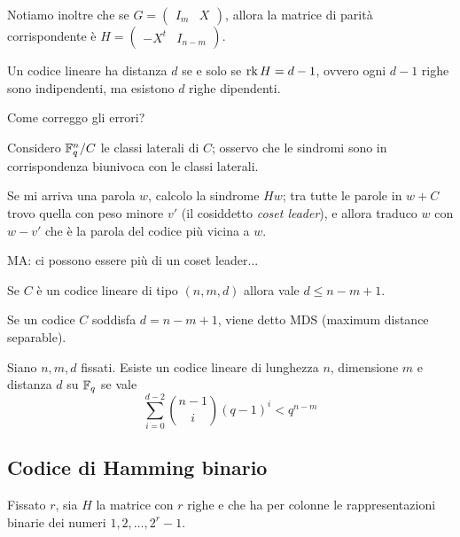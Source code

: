 \documentclass[a4paper]{book}
\begin{document}
    Notiamo inoltre che se $G=\left(\begin{array}{c|c} I_m & X \end{array}\right)$, allora la matrice di parità corrispondente è $H=\left(\begin{array}{c|c} -X^t & I_{n-m} \end{array}\right)$.

    \begin{proposition}
        Un codice lineare ha distanza $d$ se e solo se $\operatorname{rk} H = d-1$, ovvero ogni $d-1$ righe sono indipendenti, ma esistono $d$ righe dipendenti.
    \end{proposition}

    Come correggo gli errori?

    Considero $\mathbb{F}_q^n/ C$ le classi laterali di $C$; osservo che le sindromi sono in corrispondenza biunivoca con le classi laterali.

    Se mi arriva una parola $w$, calcolo la sindrome $Hw$; tra tutte le parole in $w+C$ trovo quella con peso minore $v'$ (il cosiddetto \emph{coset leader}), e allora traduco $w$ con $w-v'$ che è la parola del codice più vicina a $w$.

    MA: ci possono essere più di un coset leader...

    \begin{proposition}
        Se $C$ è un codice lineare di tipo $(n,m,d)$ allora vale $d\le n-m+1$.
    \end{proposition}

    \begin{definition}
        Se un codice $C$ soddisfa $d=n-m+1$, viene detto MDS (maximum distance separable).
    \end{definition}

    \begin{theorem}
        Siano $n,m,d$ fissati. Esiste un codice lineare di lunghezza $n$, dimensione $m$ e distanza $d$ su $\mathbb{F}_q$ se vale $$\sum_{i=0}^{d-2}\binom{n-1}{i}(q-1)^i<q^{n-m}$$

    \end{theorem}

    \subsection{Codice di Hamming binario}

    Fissato $r$, sia $H$ la matrice con $r$ righe e che ha per colonne le rappresentazioni binarie dei numeri $1,2,\dots,2^r-1$.
\end{document}
